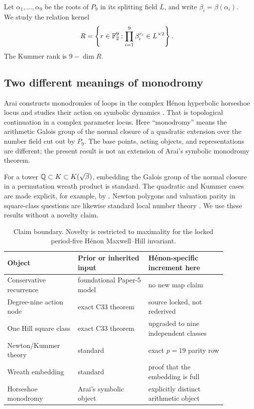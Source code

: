Let \(\alpha_1,\ldots,\alpha_9\) be the roots of \(P_9\) in its
splitting field \(L\), and write \(\beta_i=\beta(\alpha_i)\).  We study
the relation kernel
\begin{equation}
 R=\left\{r\in\mathbb{F}_2^9:
       \prod_{i=1}^{9}\beta_i^{r_i}\in L^{\times2}\right\}. \label{eq:R}
\end{equation}
The Kummer rank is \(9-\dim R\).

\subsection{Two different meanings of monodromy}

Arai constructs monodromies of loops in the complex H\'enon hyperbolic
horseshoe locus and studies their action on symbolic dynamics
\citep{arai2007loops}.  That is topological continuation in a complex
parameter locus.  Here ``monodromy'' means the arithmetic Galois group of
the normal closure of a quadratic extension over the number field cut out
by \(P_9\).  The base points, acting objects, and representations are
different; the present result is not an extension of Arai's symbolic
monodromy theorem.

For a tower \(\mathbb{Q}\subset K\subset K(\sqrt\beta)\), embedding the Galois
group of the normal closure in a permutation wreath product is standard.
The quadratic and Kummer cases are made explicit, for example, by
\citet[Theorem~1.11 and Corollary~1.14]{barquero2023wreath}.  Newton
polygons and valuation parity in square-class questions are likewise
standard local number theory \citep{serre1979localfields}.  We use these
results without a novelty claim.

\begin{table}[t]
\centering
\small
\begin{tabular}{p{0.29\linewidth}p{0.29\linewidth}p{0.31\linewidth}}
\toprule
Object & Prior or inherited input & H\'enon-specific increment here \\
\midrule
Conservative recurrence & foundational Paper-5 model & no new map claim \\
Degree-nine action node & exact C33 theorem & source locked, not rederived \\
One Hill square class & exact C33 theorem & upgraded to nine independent classes \\
Newton/Kummer theory & standard & exact \(p=19\) parity row \\
Wreath embedding & standard & proof that the embedding is full \\
Horseshoe monodromy & Arai's symbolic object & explicitly distinct arithmetic object \\
\bottomrule
\end{tabular}
\caption{Claim boundary.  Novelty is restricted to maximality for the
locked period-five H\'enon Maxwell--Hill invariant.}
\label{tab:boundary}
\end{table}
